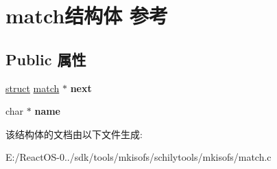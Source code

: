 \hypertarget{structmatch}{}\section{match结构体 参考}
\label{structmatch}
\subsection*{Public 属性}
\begin{DoxyCompactItemize}
\item 
\mbox{\label{structmatch_ad0386e779b287b8c8d85032fec281f9a}} 
\hyperlink{interfacestruct}{struct} \hyperlink{structmatch}{match} $\ast$ {\bfseries next}
\item 
\mbox{\label{structmatch_a8039592768d6051433a5540fe0ff2904}} 
char $\ast$ {\bfseries name}
\end{DoxyCompactItemize}


该结构体的文档由以下文件生成\+:\begin{DoxyCompactItemize}
\item 
E\+:/\+React\+O\+S-\/0../sdk/tools/mkisofs/schilytools/mkisofs/match.\+c\end{DoxyCompactItemize}
